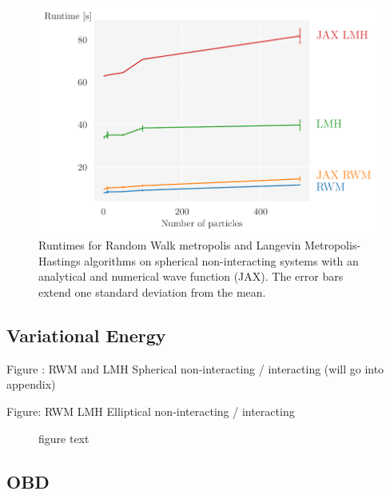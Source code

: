 \begin{figure}[!htb]
\begin{center}\includegraphics[width=\textwidth]{latex/figures/runtime_comparisons.pdf}
\end{center}
\caption{Runtimes for Random Walk metropolis and Langevin Metropolis-Hastings algorithms on spherical non-interacting systems with an analytical and numerical wave function (JAX). The error bars extend one standard deviation from the mean.}
\label{fig:runtime_comparison}
\end{figure}

\subsection{Variational Energy}

Figure : RWM and LMH Spherical non-interacting / interacting (will go into appendix)

Figure: RWM LMH Elliptical non-interacting / interacting  

\begin{figure}[!htb]
\centering
{}
\qquad
{}
\qquad
{}
\qquad
{}
\caption{figure text}
\label{fig:fig1}
\end{figure}

\subsection{OBD}

